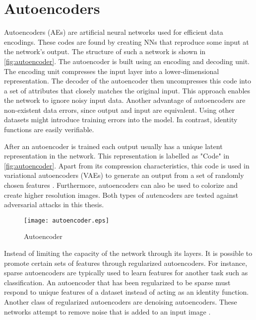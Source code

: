\section{Autoencoders}\label{sec:section}

\begingroup
Autoencoders (AEs) are artificial neural networks used for efficient data encodings. These codes are found by creating
NNs that reproduce some input at the network's output. The structure of such a network is shown in \autoref{fig:autoencoder}.
The autoencoder is built using an encoding and decoding unit. The encoding unit compresses the input layer into
a lower-dimensional representation. The decoder of the autoencoder then uncompresses this code into a set of attributes
that closely matches the original input. This approach enables the network to ignore noisy input data. Another
advantage of autoencoders are non-existent data errors, since output and input are equivalent. Using other datasets might
introduce training errors into the model. In contrast, identity functions are easily verifiable.

After an autoencoder is trained each output usually has a unique latent representation in the network. This representation is
labelled as "Code" in \autoref{fig:autoencoder}. Apart from its compression characteristics, this code is used in
variational autoencoders (VAEs) to generate an output from a set of randomly chosen features \cite{VariationalAutoencoders}.
Furthermore, autoencoders can also be used to colorize and create higher resolution images. Both types
of autencoders are tested against adversarial attacks in this thesis.
\endgroup


\begin{figure}[ht]
\centering
\texttt{[image: autoencoder.eps]}
\caption{Autoencoder}
\label{fig:autoencoder}
\end{figure}

\begingroup
Instead of limiting the capacity of the network through its layers. It is possible to promote certain sets of features
through regularized autoencoders. For instance, sparse autoencoders are typically used to learn features for another
task such as classification. An autoencoder that has been regularized to be sparse must respond to unique features of
a dataset instead of acting as an identity function. Another class of regularized autoencoders are denoising autoencoders.
These networks attempt to remove noise that is added to an input image \cite{Denoise}.
\endgroup
